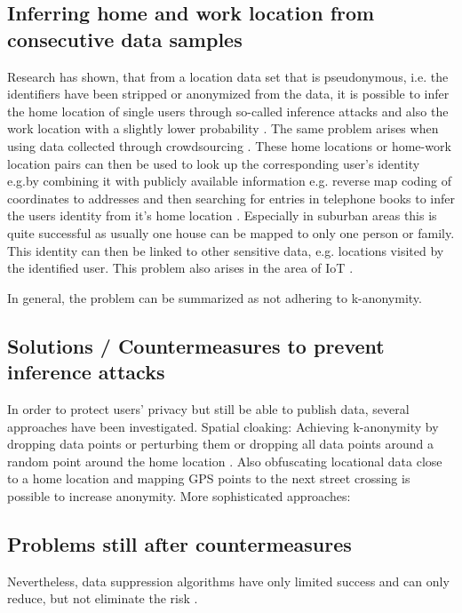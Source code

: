 \subsection{Inferring home and work location from consecutive data samples}
Research has shown, that from a location data set that is pseudonymous, i.e. the identifiers have been stripped or anonymized from the data, it is possible to infer the home location of single users through so-called inference attacks \parencite{krumm, cellphone, privacy-home-work-pairs, hoh2006enhancing, twitter} and also the work location with a slightly lower probability \parencite{cellphone, privacy-home-work-pairs}. The same problem arises when using data collected through crowdsourcing \parencite{crowdsourcing}.
These home locations or home-work location pairs can then be used to look up the corresponding user's identity e.g.by combining it with publicly available information e.g. reverse map coding of coordinates to addresses and then searching for entries in telephone books to infer the users identity from it's home location \parencite{krumm, privacy-home-work-pairs, hoh2006enhancing}. Especially in suburban areas this is quite successful as usually one house can be mapped to only one person or family. This identity can then be linked to other sensitive data, e.g. locations visited by the identified user. This problem also arises in the area of IoT \parencite{iot, hoh2006enhancing}.

In general, the problem can be summarized as not adhering to k-anonymity.

\subsection{Solutions / Countermeasures to prevent inference attacks}
In order to protect users' privacy but still be able to publish data, several approaches have been investigated. 
Spatial cloaking: Achieving k-anonymity by dropping data points or perturbing them or dropping all data points around a random point around the home location \parencite{krumm}. Also obfuscating locational data close to a home location and mapping GPS points to the next street crossing is possible to increase anonymity.
More sophisticated approaches: \parencite{time-to-confusion}

\subsection{Problems still after countermeasures}
Nevertheless, data suppression algorithms have only limited success and can only reduce, but not eliminate the risk \parencite{hoh2006enhancing}. 

